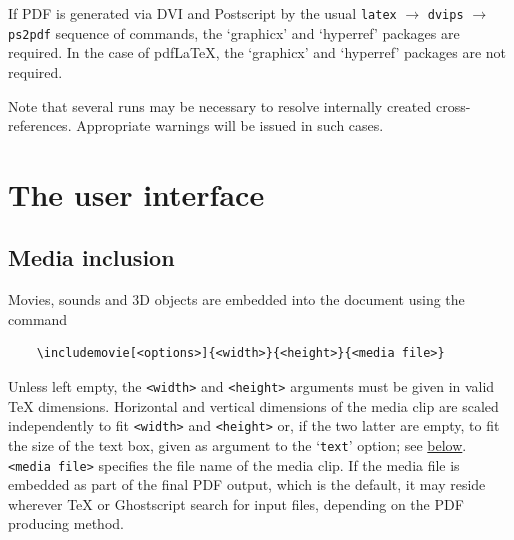 \documentclass[a4paper]{article}
\begin{document}
If PDF is generated via DVI and Postscript by the usual \verb+latex+ $\rightarrow$ \verb+dvips+ $\rightarrow$ \verb+ps2pdf+ sequence of commands, the `graphicx' and `hyperref' packages are required. In the case of pdf\LaTeX{}, the `graphicx' and `hyperref' packages are not required.

Note that several runs may be necessary to resolve internally created cross-references. Appropriate warnings will be issued in such cases.

\section{The user interface}
\subsection{Media inclusion}\label{usrif}
Movies, sounds and 3D objects are embedded into the document using the command
\begin{verbatim}
    \includemovie[<options>]{<width>}{<height>}{<media file>}
\end{verbatim}
Unless left empty, the \verb+<width>+ and \verb+<height>+ arguments must be given in valid \TeX{} dimensions. Horizontal and vertical dimensions of the media clip are scaled independently to fit \verb+<width>+ and \verb+<height>+ or, if the two latter are empty, to fit the size of the text box, given as argument to the `\verb+text+' option; see \hyperlink{lnk:textoption}{below}. \verb+<media file>+ specifies the file name of the media clip. If the media file is embedded as part of the final PDF output, which is the default, it may reside wherever \TeX{} or Ghostscript search for input files, depending on the PDF producing method.
\end{document}
